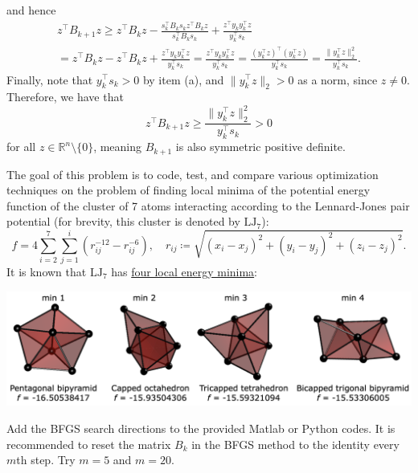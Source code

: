 \documentclass{../kin_math}
\begin{document}
\begin{questions}
\begin{enumerate}
\begin{solution}
      and hence
      \begin{multline*}
        z^\top B_{k + 1} z \geq z^\top B_k z - \frac{s_k^\top B_k s_k z^\top B_k z}{s_k^\top B_k s_k} + \frac{z^\top  y_k y_k^\top z}{y_k^\top s_k} \\
        = z^\top B_k z - z^\top B_k z + \frac{z^\top  y_k y_k^\top z}{y_k^\top s_k} = \frac{z^\top  y_k y_k^\top z}{y_k^\top s_k} = \frac{(y_k^\top z)^\top (y_k^\top z)}{y_k^\top s_k} = \frac{\lVert y_k^\top z \rVert_2^2}{y_k^\top s_k}.
      \end{multline*}
      Finally, note that $y_k^\top s_k > 0$ by item (a), and $\lVert y_k^\top z \rVert_2 > 0$ as a norm, since $z \neq 0$. Therefore, we have that
      \begin{equation*}
        z^\top B_{k + 1} z \geq \frac{\lVert y_k^\top z \rVert_2^2}{y_k^\top s_k} > 0
      \end{equation*}
      for all $z \in \mathbb{R}^n \setminus \{0\}$, meaning $B_{k + 1}$ is also symmetric positive definite.
    \end{solution}
  \end{enumerate}

  \question The goal of this problem is to code, test, and compare various optimization techniques on the problem of finding local minima of the potential energy function of the cluster of 7 atoms interacting according to the Lennard-Jones pair potential (for brevity, this cluster is denoted by $\text{LJ}_7$):
  \begin{equation}
    f = 4 \sum_{i = 2}^7 \sum_{j = 1}^i \left(r_{ij}^{-12} - r_{ij}^{-6}\right), \quad r_{ij} \coloneqq \sqrt{(x_i - x_j)^2 + (y_i - y_j)^2 + (z_i - z_j)^2}.
  \end{equation}
  It is known that $\text{LJ}_7$ has \href{https://doi.org/10.1063/1.475008}{four local energy minima}:
  \begin{center}
    \includegraphics[scale=0.25]{minima.png}
  \end{center}
  Add the BFGS search directions to the provided Matlab or Python codes. It is recommended to reset the matrix $B_k$ in the BFGS method to the identity every $m$th step. Try $m = 5$ and $m = 20$.


\end{questions}
\end{document}

